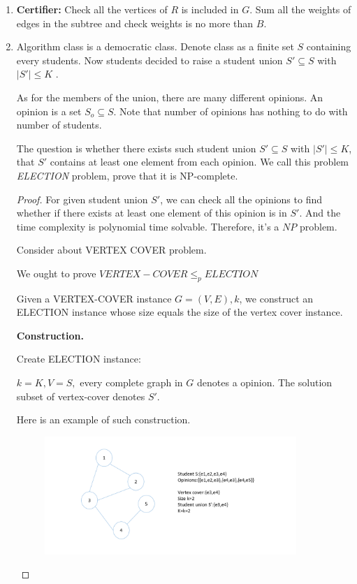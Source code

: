 \documentclass[12pt,a4paper]{article}
\makeatletter
\newtheorem*{solution}{Solution}
\theoremstyle{definition}
\renewenvironment{solution}[1][Solution] {\par\pushQED{\qed}\normalfont\topsep6\p@\@plus6\p@\relax\trivlist\item[\hskip\labelsep\bfseries#1\@addpunct{.}]\ignorespaces}{\popQED\endtrivlist\@endpefalse} \makeatother
\makeatother
\begin{document}
\begin{enumerate}
\begin{solution}
			\textbf{Certifier:} Check all the vertices of $R$ is included in $G$. Sum all the weights of edges in the subtree and check weights is no more than $B$.
		
   \end{solution}

	\item Algorithm class is a democratic class. Denote class as a finite set $S$ containing every students. Now students decided to raise a student union $S' \subseteq S$ with $|S'|\leq K$ .
	
	As for the members of the union, there are many different opinions. An opinion is a set $S_o\subseteq S$. Note that number of opinions has nothing to do with number of students.
	
	The question is whether there exists such student union $S' \subseteq S$ with $|S'|\leq K$, that $S'$ contains at least one element from each opinion. We call this problem \emph{ELECTION} problem, prove that it is NP-complete.
	\begin{proof}

		For given student union $S'$, we can check all the opinions to find whether if there exists at least one element of this opinion is in $S'$. And the time complexity is polynomial time solvable. Therefore, it's a $NP$ problem.
		
		Consider about VERTEX COVER problem. 
		
		We ought to prove $VERTEX-COVER \le_p ELECTION$
		
		Given a VERTEX-COVER instance $G = (V, E), k$, we construct an ELECTION instance whose size equals the size of the vertex cover instance.
	
		\textbf{Construction.}

		Create ELECTION instance:

		$k=K,V=S,$ every complete graph in $G$ denotes a opinion. The solution subset of vertex-cover denotes $S'$.

		Here is an example of such construction.

		\begin{figure}[H] 
			\centering 
			\includegraphics[width=0.9\textwidth]{2} 
		 

\end{figure}
\end{proof}
\end{enumerate}
\end{document}
